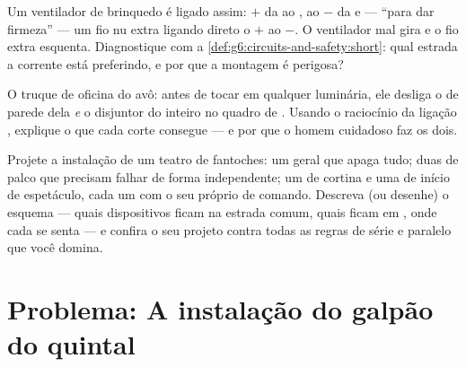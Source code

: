 \begin{exercise}[$\star\star$]\label{exo:g6:circuits-and-safety:10}
Um ventilador de brinquedo é ligado assim: $+$ da  ao ,
 ao $-$ da  e --- ``para dar firmeza'' --- um fio nu extra
ligando direto o $+$ ao $-$. O ventilador mal gira e o fio extra
esquenta. Diagnostique com a \cref{def:g6:circuits-and-safety:short}:
qual estrada a corrente está preferindo, e por que a montagem é
perigosa?
\end{exercise}

\begin{exercise}[$\star\star$]\label{exo:g6:circuits-and-safety:11}
O truque de oficina do avô: antes de tocar em qualquer luminária, ele
desliga o  de parede dela \emph{e} o disjuntor do 
inteiro no quadro de . Usando o raciocínio da ligação ,
explique o que cada corte consegue --- e por que o homem cuidadoso
faz os dois.
\end{exercise}

\begin{exercise}[$\star\star\star$]\label{exo:g6:circuits-and-safety:12}
Projete a instalação de um teatro de fantoches: um  geral
que apaga tudo; duas  de palco que precisam falhar de forma
independente; um  de cortina e uma  de início de
espetáculo, cada um com o seu próprio  de comando.
Descreva (ou desenhe) o esquema --- quais dispositivos ficam na
estrada comum, quais ficam em , onde cada  se senta
--- e confira o seu projeto contra todas as regras de série e
paralelo que você domina.
\end{exercise}

\section{Problema: A instalação do galpão do quintal}


